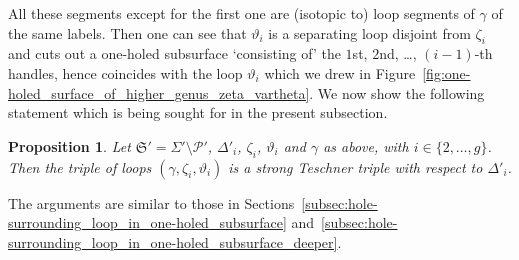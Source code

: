 \documentclass[10pt,a4paper]{amsart}
\numberwithin{equation}{section}
\newtheorem{Proposition}[Theorem]{Proposition}
\theoremstyle{definition}
\begin{document}
All these segments except for the first one are (isotopic to) loop segments of $\gamma$ of the same labels. Then one can see that $\vartheta_i$ is a separating loop disjoint from $\zeta_i$ and cuts out a one-holed subsurface `consisting of' the $1$st, $2$nd, \dots, $(i-1)$-th handles, hence coincides with the loop $\vartheta_i$ which we drew in Figure~\ref{fig:one-holed_surface_of_higher_genus_zeta_vartheta}.
We now show the following statement which is being sought for in the present subsection.
\begin{Proposition}
\label{prop:zeta_i_and_vartheta_i}
Let $\mathfrak{S}' = \Sigma'\setminus\mathcal{P}'$, $\Delta'_i$, $\zeta_i$, $\vartheta_i$ and $\gamma$ as above, with $i \in \{2,\dots,g\}$. Then the triple of loops $(\gamma,\zeta_i,\vartheta_i)$ is a strong Teschner triple with respect to $\Delta'_i$.
\end{Proposition}
The arguments are similar to those in Sections~\ref{subsec:hole-surrounding_loop_in_one-holed_subsurface} and~\ref{subsec:hole-surrounding_loop_in_one-holed_subsurface_deeper}.
\end{document}
